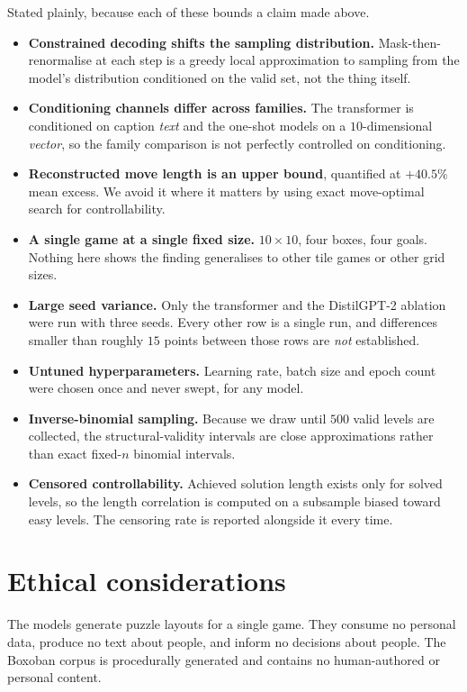 \documentclass[11pt,a4paper]{report}
\begin{document}
Stated plainly, because each of these bounds a claim made above.

\begin{itemize}[leftmargin=1.5em,itemsep=3pt]
\item \textbf{Constrained decoding shifts the sampling distribution.}
      Mask-then-renormalise at each step is a greedy local approximation to
      sampling from the model's distribution conditioned on the valid set, not
      the thing itself.
\item \textbf{Conditioning channels differ across families.} The transformer is
      conditioned on caption \emph{text} and the one-shot models on a
      $10$-dimensional \emph{vector}, so the family comparison is not perfectly
      controlled on conditioning.
\item \textbf{Reconstructed move length is an upper bound}, quantified at
      $+40.5\%$ mean excess. We avoid it where it matters by using exact
      move-optimal search for controllability.
\item \textbf{A single game at a single fixed size.} $10\times10$, four boxes,
      four goals. Nothing here shows the finding generalises to other tile games
      or other grid sizes.
\item \textbf{Large seed variance.} Only the transformer and the DistilGPT-2
      ablation were run with three seeds. Every other row is a single run, and
      differences smaller than roughly $15$ points between those rows are
      \emph{not} established.
\item \textbf{Untuned hyperparameters.} Learning rate, batch size and epoch count
      were chosen once and never swept, for any model.
\item \textbf{Inverse-binomial sampling.} Because we draw until $500$ valid
      levels are collected, the structural-validity intervals are close
      approximations rather than exact fixed-$n$ binomial intervals.
\item \textbf{Censored controllability.} Achieved solution length exists only for
      solved levels, so the length correlation is computed on a subsample biased
      toward easy levels. The censoring rate is reported alongside it every time.
\end{itemize}

\section{Ethical considerations}

The models generate puzzle layouts for a single game. They consume no personal
data, produce no text about people, and inform no decisions about people. The
Boxoban corpus is procedurally generated and contains no human-authored or
personal content.
\end{document}
